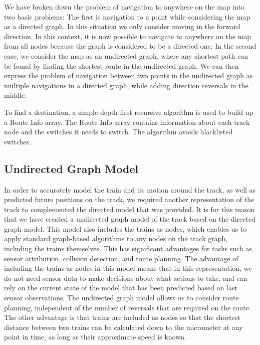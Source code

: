 \documentclass[letterpaper]{article}
\begin{document}
We have broken down the problem of navigation to anywhere on the map into two basic problems: The first is navigation to a point while considering the map as a directed graph.  In this situation we only consider moving in the forward direction.  In this context, it is now possible to navigate to anywhere on the map from all nodes because the graph is considered to be a directed one.  In the second case, we consider the map as an undirected graph, where any shortest path can be found by finding the shortest route in the undirected graph.  We can then express the problem of navigation between two points in the undirected graph as multiple navigations in a directed graph, while adding direction reversals in the middle.

To find a destination, a simple depth first recursive algorithm is used to build up a Route Info array. The Route Info array contains information about each track node and the switches it needs to switch. The algorithm avoids blacklisted switches.


\subsection{Undirected Graph Model%
  \label{undirected-graph-model}%
}

In order to accurately model the train and its motion around the track, as well as predicted future positions on the track, we required another representation of the track to complemented the directed model that was provided.  It is for this reason that we have created a undirected graph model of the track based on the directed graph model.  This model also includes the trains as nodes, which enables us to apply standard graph-based algorithms to any nodes on the track graph, including the trains themselves.  This has significant advantages for tasks such as sensor attribution, collision detection, and route planning.  The advantage of including the trains as nodes in this model means that in this representation, we do not need sensor data to make decisions about what actions to take, and can rely on the current state of the model that has been predicted based on last sensor observations.  The undirected graph model allows us to consider route planning, independent of the number of reversals that are required on the route.  The other advantage is that trains are included as nodes so that the shortest distance between two trains can be calculated down to the micrometer at any point in time, as long as their approximate speed is known.
\end{document}
